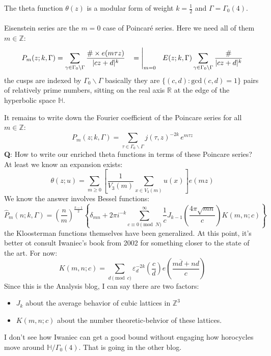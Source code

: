 \documentclass[12pt]{article}
\begin{document}
The theta function $\theta(z)$ is a  modular form of weight $k = \frac{1}{2}$ and $\Gamma = \Gamma_0(4)$. \\ \\
Eisenstein series are the $m = 0$ case of Poincar\'{e} series.  Here we need all of them $m \in \mathbb{Z}$:
$$ P_m(z; k , \Gamma) =   \sum_{\gamma \in \Gamma_0 \backslash \Gamma } \frac{\# \times e(m \tau z)}{|cz+d|^k} \hspace{0.125in} = \Bigg|_{m=0} \hspace{0.125in} E(z; k ,\Gamma)  \sum_{\gamma \in \Gamma_0 \backslash \Gamma }  \frac{\#}{|cz+d|^k} $$
the cusps are indexed by $\Gamma_0 \backslash \Gamma$ basically they are $\{ (c,d) : \mathrm{gcd}(c,d) = 1 \}$ pairs of relatively prime numbers, sitting on the real axis $\mathbb{R}$ at the edge of the hyperbolic space $\mathbb{H}$.

\newpage \noindent It remains to write down the Fourier coefficient of the Poincare series for all $m \in \mathbb{Z}$:
$$ P_m( z; k , \Gamma) = \sum_{\tau \in \Gamma_0 \backslash \Gamma } j(\tau, z)^{-2k} \, e^{m\tau z} $$
\textbf{Q}: How to write our enriched theta functions in terms of these Poincare series?  At least we know an expansion exists:
$$ \theta(z; u) = \sum_{m \geq 0} \left[ \frac{1}{V_3(m)} \sum_{x \in V_3(m)} u(x)  \right]  e(mz) $$
We know the answer involves Bessel functions:
$$ \widehat{P}_m (n; k , \Gamma) = \left( \frac{n}{m} \right)^{\frac{k-1}{2}} 
\left\{  \delta_{mn} + 2\pi i^{-k} \sum_{c \equiv 0 \pmod N}^\infty \frac{1}{c}
J_{k-1} \left( \frac{4\pi \sqrt{mn}}{c}\right) K(m,n; c) \right\} $$
the Kloosterman functions themselves have been generalized.  At this point, it's better ot consult Iwaniec's book from 2002 for something closer to the state of the art.  For now:
$$ K(m,n;c) = \sum_{d \pmod c} \varepsilon_d^{-2k} \left( \frac{c}{d} \right) e \left(  \frac{m \overline{d} +  n d}{c} \right) $$
Since this is the Analysis blog, I can say there are two factors:
\begin{itemize}
\item $J_k$ about the average behavior of cubic lattices in $\mathbb{Z}^3$
\item $K(m,n;c)$ about the number theoretic-behvior of these lattices.
\end{itemize}
I don't see how Iwaniec can get a good bound without engaging how horocycles move around $\mathbb{H}/\Gamma_0(4)$.  That is going in the other blog. 

\newpage 
\end{document}
